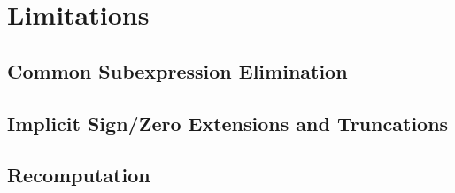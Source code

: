%

\chapter{Limitations}

\section{Common Subexpression Elimination}
\section{Implicit Sign/Zero Extensions and Truncations}
\section{Recomputation}
